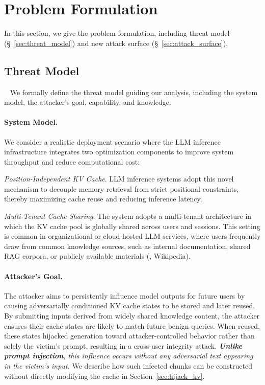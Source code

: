 \section{Problem Formulation}
In this section, we give the problem formulation, including threat model (\S~\ref{sec:threat_model}) and new attack surface (\S~\ref{sec:attack_surface}).

\subsection{Threat Model}~\label{sec:threat_model}
We formally define the threat model guiding our analysis, including the system model, the attacker's goal, capability, and knowledge.

\paragraph{System Model.}
We consider a realistic deployment scenario where the LLM inference infrastructure integrates two optimization components to improve system throughput and reduce computational cost: 
\begin{icompact}
    \item \emph{Position-Independent KV Cache}. LLM inference systems adopt this novel mechanism to decouple memory retrieval from strict positional constraints, thereby maximizing cache reuse and reducing inference latency.
    \item \emph{Multi-Tenant Cache Sharing}. The system adopts a multi-tenant architecture in which the KV cache pool is globally shared across users and sessions. This setting is common in organizational or cloud-hosted LLM services, where users frequently draw from common knowledge sources, such as internal documentation, shared RAG corpora, or publicly available materials (\eg, Wikipedia).
\end{icompact}

\paragraph{Attacker's Goal.}
The attacker aims to persistently influence model outputs for future users by causing adversarially conditioned KV cache states to be stored and later reused. By submitting inputs derived from widely shared knowledge content, the attacker ensures their cache states are likely to match future benign queries. When reused, these states hijacked generation toward attacker-controlled behavior rather than solely the victim's prompt, resulting in a cross-user integrity attack. \emph{\textbf{Unlike prompt injection}, this influence occurs without any adversarial text appearing in the victim's input.} We describe how such infected chunks can be constructed without directly modifying the cache in Section~\ref{sec:hijack_kv}.

